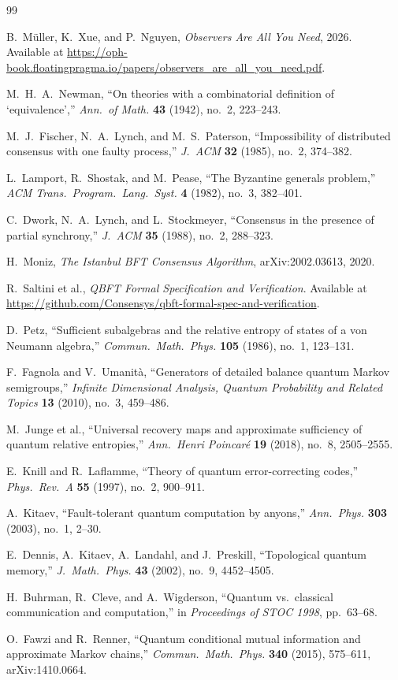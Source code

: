 \documentclass[11pt]{article}
\theoremstyle{remark}
\theoremstyle{plain}
\begin{document}
\begin{thebibliography}{99}

B.~M\"uller, K.~Xue, and P.~Nguyen,
\emph{Observers Are All You Need},
2026.\\
Available at \url{https://oph-book.floatingpragma.io/papers/observers_are_all_you_need.pdf}.

M.~H.~A.~Newman,
``On theories with a combinatorial definition of `equivalence',''
\emph{Ann.\ of Math.} \textbf{43} (1942), no.~2, 223--243.

M.~J.~Fischer, N.~A.~Lynch, and M.~S.~Paterson,
``Impossibility of distributed consensus with one faulty process,''
\emph{J.\ ACM} \textbf{32} (1985), no.~2, 374--382.

L.~Lamport, R.~Shostak, and M.~Pease,
``The Byzantine generals problem,''
\emph{ACM Trans.\ Program.\ Lang.\ Syst.} \textbf{4} (1982), no.~3, 382--401.

C.~Dwork, N.~A.~Lynch, and L.~Stockmeyer,
``Consensus in the presence of partial synchrony,''
\emph{J.\ ACM} \textbf{35} (1988), no.~2, 288--323.

H.~Moniz,
\emph{The Istanbul BFT Consensus Algorithm},
arXiv:2002.03613, 2020.

R.~Saltini et al.,
\emph{QBFT Formal Specification and Verification}.
Available at \url{https://github.com/Consensys/qbft-formal-spec-and-verification}.

D.~Petz,
``Sufficient subalgebras and the relative entropy of states of a von Neumann algebra,''
\emph{Commun.\ Math.\ Phys.} \textbf{105} (1986), no.~1, 123--131.

F.~Fagnola and V.~Umanit\`a,
``Generators of detailed balance quantum Markov semigroups,''
\emph{Infinite Dimensional Analysis, Quantum Probability and Related Topics}
\textbf{13} (2010), no.~3, 459--486.

M.~Junge et al.,
``Universal recovery maps and approximate sufficiency of quantum relative entropies,''
\emph{Ann.\ Henri Poincar\'e} \textbf{19} (2018), no.~8, 2505--2555.

E.~Knill and R.~Laflamme,
``Theory of quantum error-correcting codes,''
\emph{Phys.\ Rev.\ A} \textbf{55} (1997), no.~2, 900--911.

A.~Kitaev,
``Fault-tolerant quantum computation by anyons,''
\emph{Ann.\ Phys.} \textbf{303} (2003), no.~1, 2--30.

E.~Dennis, A.~Kitaev, A.~Landahl, and J.~Preskill,
``Topological quantum memory,''
\emph{J.\ Math.\ Phys.} \textbf{43} (2002), no.~9, 4452--4505.

H.~Buhrman, R.~Cleve, and A.~Wigderson,
``Quantum vs.\ classical communication and computation,''
in \emph{Proceedings of STOC 1998}, pp.~63--68.

O.~Fawzi and R.~Renner,
``Quantum conditional mutual information and approximate Markov chains,''
\emph{Commun.\ Math.\ Phys.} \textbf{340} (2015), 575--611,
arXiv:1410.0664.

\end{thebibliography}
\end{document}
